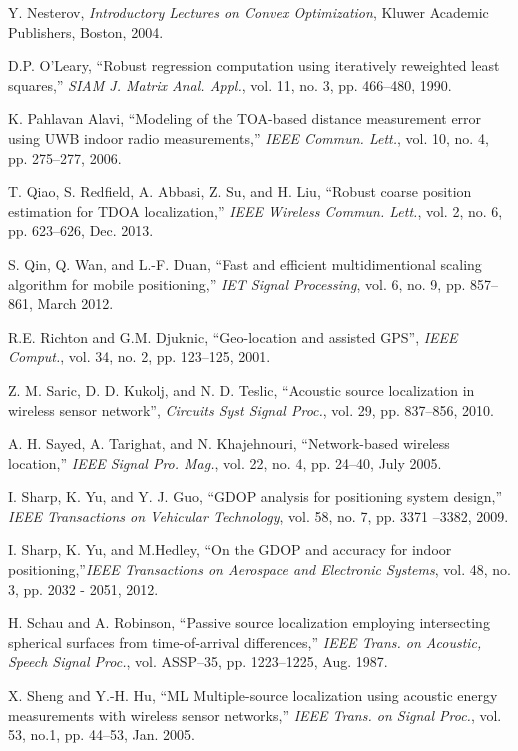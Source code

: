 \begin{thebibliography}{99}
Y. Nesterov, {\em Introductory Lectures on Convex Optimization}, Kluwer Academic Publishers, Boston, 2004.

D.P. O'Leary, ``Robust regression computation using iteratively reweighted least squares,'' {\em SIAM J. Matrix Anal. Appl.}, vol. 11, no. 3, pp. 466--480, 1990.


K. Pahlavan Alavi, ``Modeling of the TOA-based distance measurement error using UWB indoor radio measurements,'' {\em IEEE Commun. Lett.}, vol. 10, no. 4, pp. 275--277, 2006.


T. Qiao, S. Redfield, A. Abbasi, Z. Su, and H. Liu, ``Robust coarse position estimation for TDOA localization,'' {\em IEEE Wireless Commun. Lett.}, vol. 2, no. 6, pp. 623--626, Dec. 2013.

S. Qin, Q. Wan, and L.-F. Duan, ``Fast and efficient multidimentional scaling algorithm for mobile positioning,'' {\em IET Signal Processing}, vol. 6, no. 9, pp. 857--861, March 2012.


R.E. Richton and G.M. Djuknic, ``Geo-location and assisted GPS'', {\em IEEE Comput.}, vol. 34, no. 2, pp. 123--125, 2001.


Z. M. Saric, D. D. Kukolj, and N. D. Teslic, ``Acoustic source localization in wireless sensor network'', {\em Circuits Syst Signal Proc.}, vol. 29, pp. 837--856, 2010.

 \label{r10}
A. H. Sayed, A. Tarighat, and N. Khajehnouri, ``Network-based wireless location,'' {\em IEEE Signal Pro. Mag.}, vol. 22, no. 4, pp. 24--40, July 2005.

I. Sharp, K. Yu, and Y. J. Guo, ``GDOP analysis for positioning system design,'' {\em IEEE Transactions on Vehicular Technology}, vol. 58, no. 7, pp. 3371 --3382, 2009.

I. Sharp, K. Yu, and M.Hedley, 
``On the GDOP and accuracy for indoor positioning,''{\em IEEE Transactions on Aerospace and Electronic Systems}, vol. 48, no. 3, pp. 2032 - 2051, 2012.

 \label{r4}
H. Schau and A. Robinson, ``Passive source localization employing intersecting spherical surfaces from time-of-arrival differences,'' {\em IEEE Trans. on Acoustic, Speech Signal Proc.}, vol. ASSP--35, pp. 1223--1225, Aug. 1987.

X. Sheng and Y.-H. Hu, ``ML Multiple-source localization using acoustic energy measurements with wireless sensor networks,'' {\em IEEE Trans. on Signal Proc.}, vol. 53, no.1, pp. 44--53, Jan. 2005.


\end{thebibliography}
